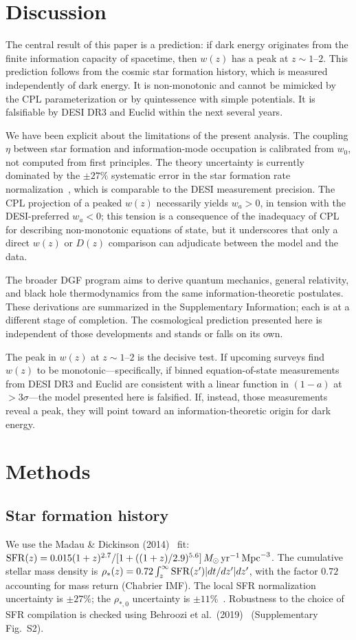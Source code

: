 \documentclass[12pt,a4paper]{article}
\begin{document}
\section*{Discussion}

The central result of this paper is a prediction: if dark energy originates from the finite information capacity of spacetime, then $w(z)$ has a peak at $z\sim1$--$2$. This prediction follows from the cosmic star formation history, which is measured independently of dark energy. It is non-monotonic and cannot be mimicked by the CPL parameterization or by quintessence with simple potentials. It is falsifiable by DESI DR3 and Euclid within the next several years.

We have been explicit about the limitations of the present analysis. The coupling $\eta$ between star formation and information-mode occupation is calibrated from $w_0$, not computed from first principles. The theory uncertainty is currently dominated by the $\pm27\%$ systematic error in the star formation rate normalization~\cite{madau2014}, which is comparable to the DESI measurement precision. The CPL projection of a peaked $w(z)$ necessarily yields $w_a>0$, in tension with the DESI-preferred $w_a<0$; this tension is a consequence of the inadequacy of CPL for describing non-monotonic equations of state, but it underscores that only a direct $w(z)$ or $D(z)$ comparison can adjudicate between the model and the data.

The broader DGF program aims to derive quantum mechanics, general relativity, and black hole thermodynamics from the same information-theoretic postulates. These derivations are summarized in the Supplementary Information; each is at a different stage of completion. The cosmological prediction presented here is independent of those developments and stands or falls on its own.

The peak in $w(z)$ at $z\sim1$--$2$ is the decisive test. If upcoming surveys find $w(z)$ to be monotonic---specifically, if binned equation-of-state measurements from DESI DR3 and Euclid are consistent with a linear function in $(1-a)$ at $>3\sigma$---the model presented here is falsified. If, instead, those measurements reveal a peak, they will point toward an information-theoretic origin for dark energy.

\section*{Methods}

\subsection*{Star formation history}
We use the Madau \& Dickinson (2014)~\cite{madau2014} fit: ${\rm SFR}(z)=0.015(1+z)^{2.7}/[1+((1+z)/2.9)^{5.6}]\,M_\odot\,{\rm yr}^{-1}\,{\rm Mpc}^{-3}$. The cumulative stellar mass density is $\rho_*(z)=0.72\int_z^\infty{\rm SFR}(z')|dt/dz'|dz'$, with the factor $0.72$ accounting for mass return (Chabrier IMF). The local SFR normalization uncertainty is $\pm27\%$; the $\rho_{*,0}$ uncertainty is $\pm11\%$~\cite{driver2018}. Robustness to the choice of SFR compilation is checked using Behroozi et al.\ (2019)~\cite{behroozi2019} (Supplementary Fig.~S2).
\end{document}
